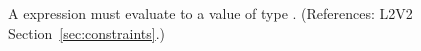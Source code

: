 A \Constraint {} expression must evaluate to a value of type
.  (References: L2V2 Section~\ref{sec:constraints}.)
